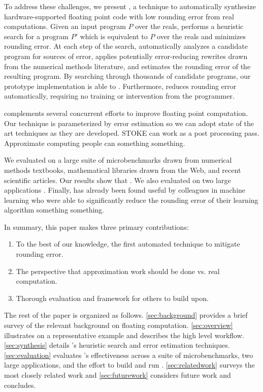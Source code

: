 \documentclass[paper.tex]{subfiles}
\begin{document}
To address these challenges, we present \casio, a technique to
automatically synthesize hardware-supported floating point code with
low rounding error  from real computations.  Given an
input program $P$ over the reals, \casio performs a heuristic search
for a program $P'$ which is equivalent to $P$ over the reals and
minimizes rounding error.  At each step of the search, \casio
automatically analyzes a candidate program for sources of error,
applies potentially error-reducing rewrites drawn from the numerical
methods literature, and estimates the rounding error of the resulting
program.  By searching through thousands of candidate programs, our
prototype implementation is able to .  Furthermore, \casio reduces rounding error
automatically, requiring no training or intervention from the
programmer.

\casio complements several concurrent efforts to improve floating
point computation.  Our technique is parameterized by error estimation
so we can adopt state of the art techniques as they are developed.
STOKE can work as a post processing pass.  Approximate computing
people can something something.

We evaluated \casio on a large suite of microbenchmarks drawn from
numerical methods textbooks, mathematical libraries drawn from the
Web, and recent scientific articles.  Our results show that \casio
{}.  We also evaluated \casio on two large applications
.  Finally, \casio has already been found useful by
colleagues in machine learning who were able to significantly reduce
the rounding error of their learning algorithm something something.

In summary, this paper makes three primary contributions:
\begin{enumerate}
\item To the best of our knowledge, the first automated technique to
  mitigate rounding error.
\item The perspective that approximation work should be done vs. real computation.
\item Thorough evaluation and framework for others to build upon.
\end{enumerate}

The rest of the paper is organized as follows.  \cref{sec:background}
provides a brief survey of the relevant background on floating
computation.  \cref{sec:overview} illustrates \casio on a
representative example and describes the high level \casio workflow.
\cref{sec:synthesis} details \casio's heuristic search and error
estimation techniques.  \cref{sec:evaluation} evaluates \casio's
effectiveness across a suite of microbenchmarks, two large
applications, and the effort to build and run \casio.
\cref{sec:relatedwork} surveys the most closely related work and
\cref{sec:futurework} considers future work and concludes.
\end{document}
